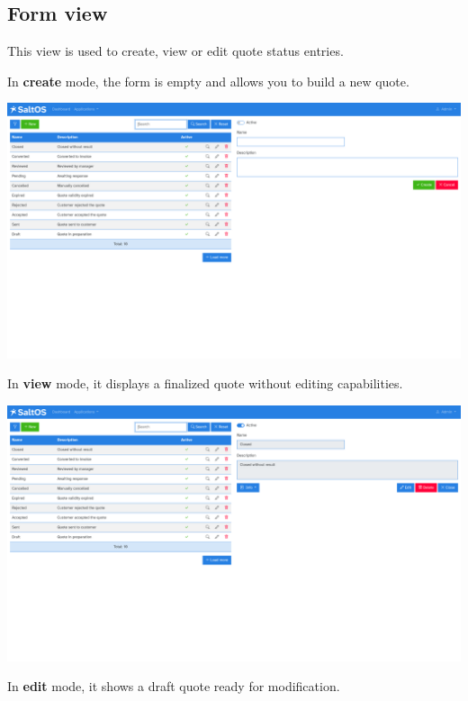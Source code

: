 \documentclass[a4paper]{article}
\begin{document}
\hypertarget{toc79}{}
\subsection{Form view}

This view is used to create, view or edit quote status entries.

In \textbf{create} mode, the form is empty and allows you to build a new quote.

\begin{center}\includegraphics[width=1\textwidth]{../ujest/snaps/test-screenshots-js-screenshots-crm-quotes-status-create-en-us-1-snap.png}\end{center}

In \textbf{view} mode, it displays a finalized quote without editing capabilities.

\begin{center}\includegraphics[width=1\textwidth]{../ujest/snaps/test-screenshots-js-screenshots-crm-quotes-status-view-10-en-us-1-snap.png}\end{center}

In \textbf{edit} mode, it shows a draft quote ready for modification.
\end{document}
